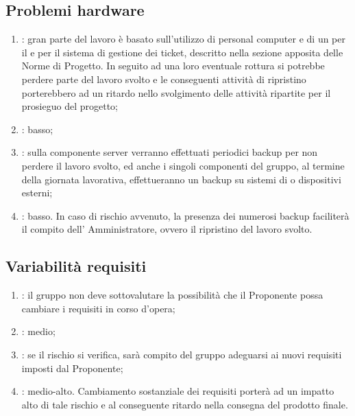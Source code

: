 \subsection{Problemi hardware}
\begin{enumerate}
\item {}: gran parte del lavoro è basato sull'utilizzo di personal computer e di un  per il  e per il sistema di gestione dei ticket, descritto nella sezione apposita delle Norme di Progetto. In seguito ad una loro eventuale rottura si potrebbe perdere parte del lavoro svolto e le conseguenti attività di ripristino porterebbero ad un ritardo nello svolgimento delle attività ripartite per il prosieguo del progetto;
\item {}: basso;
\item {}: sulla componente server verranno effettuati periodici backup per non perdere il lavoro svolto, ed anche i singoli componenti del gruppo, al termine della giornata lavorativa, effettueranno un backup su sistemi di  o dispositivi  esterni;
\item {}: basso. In caso di rischio avvenuto, la presenza dei numerosi backup faciliterà il compito dell' Amministratore, ovvero il ripristino del lavoro svolto.
\end{enumerate}

\subsection{Variabilità requisiti}
\begin{enumerate}
\item {}: il gruppo non deve sottovalutare la possibilità che il Proponente possa cambiare i requisiti in corso d'opera;
\item {}: medio;
\item {}: se il rischio si verifica, sarà compito del gruppo adeguarsi ai nuovi requisiti imposti dal Proponente;
\item {}: medio-alto. Cambiamento sostanziale dei requisiti porterà ad un impatto alto di tale rischio e al conseguente ritardo nella consegna del prodotto finale.
\end{enumerate}

